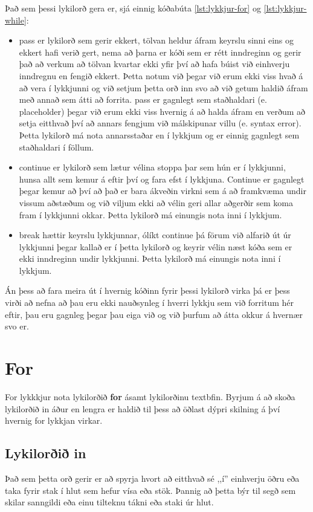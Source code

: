 Það sem þessi lykilorð gera er, sjá einnig kóðabúta \ref{lst:lykkjur-for} og \ref{lst:lykkjur-while}:
\begin{itemize}
	\item pass er lykilorð sem gerir ekkert, tölvan heldur áfram keyrslu sinni eins og ekkert hafi verið gert, nema að þarna er kóði sem er rétt inndreginn og gerir það að verkum að tölvan kvartar ekki yfir því að hafa búist við einhverju inndregnu en fengið ekkert.
	Þetta notum við þegar við erum ekki viss hvað á að vera í lykkjunni og við setjum þetta orð inn svo að við getum haldið áfram með annað sem átti að forrita.
	pass er gagnlegt sem staðhaldari (e. placeholder) þegar við erum ekki viss hvernig á að halda áfram en verðum að setja eitthvað því að annars fengjum við málskipunar villu (e. syntax error).
	Þetta lykilorð má nota annarsstaðar en í lykkjum og er einnig gagnlegt sem staðhaldari í föllum.
	\item continue er lykilorð sem lætur vélina stoppa þar sem hún er í lykkjunni, hunsa allt sem kemur á eftir því og fara efst í lykkjuna.
	Continue er gagnlegt þegar kemur að því að það er bara ákveðin virkni sem á að framkvæma undir vissum aðstæðum og við viljum ekki að vélin geri allar aðgerðir sem koma fram í lykkjunni okkar.
	Þetta lykilorð má einungis nota inni í lykkjum.
	\item break hættir keyrslu lykkjunnar, ólíkt continue þá förum við alfarið út úr lykkjunni þegar kallað er í þetta lykilorð og keyrir vélin næst kóða sem er ekki inndreginn undir lykkjunni.
	Þetta lykilorð má einungis nota inni í lykkjum.
\end{itemize}

Án þess að fara meira út í hvernig kóðinn fyrir þessi lykilorð virka þá er þess virði að nefna að þau eru ekki nauðsynleg í hverri lykkju sem við forritum hér eftir, þau eru gagnleg þegar þau eiga við og við þurfum að átta okkur á hvernær svo er.

\section{For}
For lykkkjur nota lykilorðið \textbf{for} ásamt lykilorðinu textbf{in}.
Byrjum á að skoða lykilorðið in áður en lengra er haldið til þess að öðlast dýpri skilning á því hvernig for lykkjan virkar.

\subsection{Lykilorðið in}
Það sem þetta orð gerir er að spyrja hvort að eitthvað sé ,,í'' einhverju öðru eða taka fyrir stak í hlut sem hefur vísa eða stök.
Þannig að þetta býr til segð sem skilar sanngildi eða einu tilteknu tákni eða staki úr hlut.

